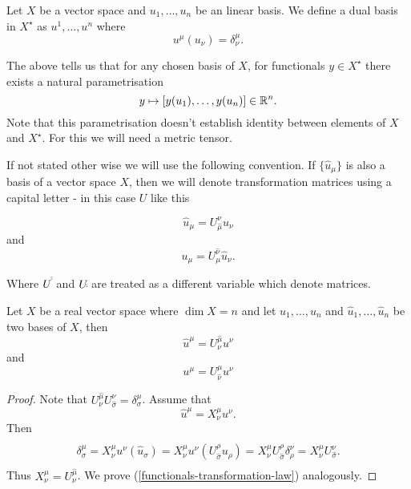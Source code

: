 \documentclass[main.tex]{subfiles}
\begin{document}
\begin{definition}
Let $X$ be a vector space and $u_1, \dots, u_n$ be an linear basis. We define a dual basis in $X^\star$ as $u^1, \dots, u^n$ where
\begin{equation}
u^\mu(u_\nu) = \delta^\mu_\nu. 
\end{equation} 
\end{definition}

The above tells us that for any chosen basis of $X$, for functionals $y\in X^\star$ there exists a natural parametrisation 
\begin{equation}
y \mapsto [y(u_1), \dots, y(u_n)]\in \mathbb{R}^n. 
\end{equation}
Note that this parametrisation doesn't establish identity between elements of $X$ and $X^\star$. For this we will need a metric tensor.

If not stated other wise we will use the following convention. If $\{\hat{u}_\mu\}$ is also a basis of a vector space $X$, then we will denote transformation matrices using a capital letter - in this case $U$ like this

\begin{equation}
\hat{u}_\mu = U^\nu_{\hat{\mu}} u_\nu
\end{equation}
and
\begin{equation}
u_\mu =  U^{\hat{\nu}}_\mu  \hat{u}_\nu.
\end{equation}

Where $U^{\hat{\dot}}$ and $U_{\hat{\dot}}$ are treated as a different variable which denote matrices.

\begin{theorem}
\label{basis-functional-basis-relation}
Let $X$ be a real vector space where $\dim X = n$ and let $u_1, \dots, u_n$ and $\hat{u}_1, \dots, \hat{u}_n$ be two bases of $X$, then
\begin{equation}
\hat{u}^\mu =  U^{\hat{\mu}}_{\nu} u^\nu
\end{equation}
and 
\begin{equation}
\label{functionals-transformation-law}
u^\mu = U^{\mu}_{\hat{\nu}} u^\nu
\end{equation}
\end{theorem}
\begin{proof}
Note that $U^{\hat{\mu}}_{\nu} U^{\nu}_{\hat{\sigma}} = \delta^\mu_\sigma$. Assume that 
\begin{equation}
\hat{u}^\mu = X^{\mu}_\nu u^\nu.
\end{equation}
Then
\begin{multline*}
\\
\delta^\mu_\sigma = X^\mu_\nu u^\nu(\hat{u}_\sigma) = X^\mu_\nu u^\nu(U^\rho_{\hat{\sigma}} u_\rho) = 
X^\mu_\nu U^\rho_{\hat{\sigma}} \delta^\nu_\rho = X^\mu_\nu U^\nu_{\hat{\sigma}}.
\\
\end{multline*}
Thus $X^\mu_\nu = U^{\hat{\mu}}_{\nu}$.
We prove (\ref{functionals-transformation-law}) analogously.
\end{proof}
\end{document}

